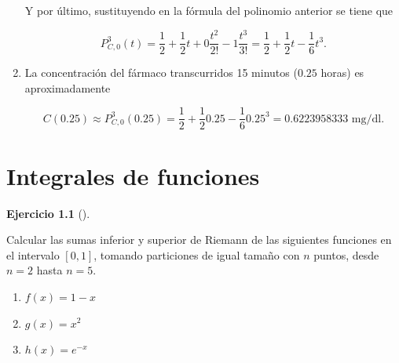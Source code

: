 \documentclass[
  a4paper,
]{scrreport}
\theoremstyle{definition}
\newtheorem{exercise}{Ejercicio}[chapter]
\theoremstyle{remark}
\begin{document}
\begin{tcolorbox}
\begin{enumerate}
  Y por último, sustituyendo en la fórmula del polinomio anterior se
  tiene que

  \[
   P_{C,0}^3(t)=\frac{1}{2}+\frac{1}{2}t+0\frac{t^2}{2!}-1\frac{t^3}{3!}=\frac{1}{2}+\frac{1}{2}t-\frac{1}{6}t^3.
   \]
\item
  La concentración del fármaco transcurridos 15 minutos (\(0.25\) horas)
  es aproximadamente

  \[
   C(0.25)\approx P_{C,0}^3(0.25)= \frac{1}{2}+\frac{1}{2}0.25-\frac{1}{6}0.25^3= 0.6223958333 \mbox{ mg/dl}.
   \]
\end{enumerate}

\end{tcolorbox}


\chapter{Integrales de funciones}\label{integrales-de-funciones}

\begin{exercise}[]\protect\hypertarget{exr-sumas-inferiores-superiores-riemann}{}\label{exr-sumas-inferiores-superiores-riemann}

Calcular las sumas inferior y superior de Riemann de las siguientes
funciones en el intervalo \([0,1]\), tomando particiones de igual tamaño
con \(n\) puntos, desde \(n=2\) hasta \(n=5\).

\begin{enumerate}
\def\labelenumi{\alph{enumi}.}
\item
  \(f(x) = 1-x\)
\item
  \(g(x) = x^2\)
\item
  \(h(x) = e^{-x}\)
\end{enumerate}

\end{exercise}
\end{document}
